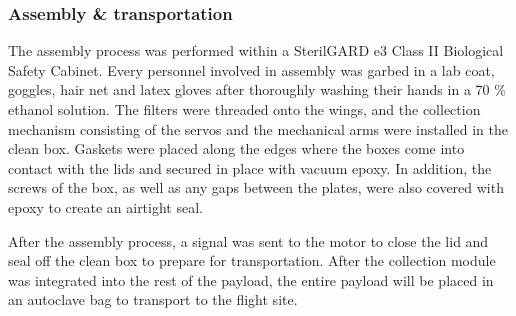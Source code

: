 \subsubsection{Assembly \& transportation}
\label{sec:Assembly}
The assembly process was performed within a SterilGARD e3 Class II Biological Safety Cabinet. Every personnel involved in assembly was garbed in a lab coat, goggles, hair net and latex gloves after thoroughly washing their hands in a 70 \% ethanol solution. The filters were threaded onto the wings, and the collection mechanism consisting of the servos and the mechanical arms were installed in the clean box. Gaskets were placed along the edges where the boxes come into contact with the lids and secured in place with vacuum epoxy. In addition, the screws of the box, as well as any gaps between the plates, were also covered with epoxy to create an airtight seal. 

After the assembly process, a signal was sent to the motor to close the lid and seal off the clean box to prepare for transportation. After the collection module was integrated into the rest of the payload, the entire payload will be placed in an autoclave bag to transport to the flight site.

